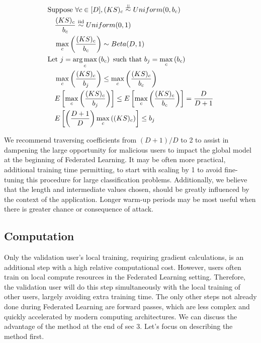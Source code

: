 \documentclass{article} %
\newcommand{\indep}{\perp \!\!\! \perp}
\newcommand{\yli}[1]{{\color{cyan}#1}}
\begin{document}
\begin{align}
    & \textrm{Suppose } \forall c \in \mathopen[ D \mathclose], (KS)_c \overset{\indep}{\sim} Uniform(0, b_c) \nonumber \\
    & \quad \dfrac{(KS)_c}{b_c} \overset{\mathrm{iid}}{\sim} Uniform(0, 1) \nonumber \\
    & \quad \max_c \left( \dfrac{(KS)_c}{b_c} \right) \sim Beta(D, 1) \nonumber \\
    & \textrm{Let } j = \argmax_c \left( b_c \right) \textrm{ such that } b_j = \max_c \left( b_c \right) \nonumber \\
    & \quad \max_c \left( \dfrac{(KS)_c}{b_j} \right) \leq \max_c \left( \dfrac{(KS)_c}{b_c} \right) \nonumber \\
    & \quad E \left[ \max_c \left( \dfrac{(KS)_c}{b_j} \right) \right] \leq E \left[ \max_c \left( \dfrac{(KS)_c}{b_c} \right) \right] = \dfrac{D}{D + 1} \nonumber \\
    & \quad E \left[ \left( \dfrac{D + 1}{D} \right) \max_c \left( (KS)_c \right) \right] \leq b_j \label{eq:leq_bound}
\end{align}

We recommend traversing coefficients from $(D + 1) / D$ to 2 to assist in dampening the large opportunity for malicious users to impact the global model at the beginning of Federated Learning. It may be often more practical, additional training time permitting, to start with scaling by 1 to avoid fine-tuning this procedure for large classification problems. Additionally, we believe that the length and intermediate values chosen, should be greatly influenced by the context of the application. Longer warm-up periods may be most useful when there is greater chance or consequence of attack.


\subsection{Computation}
Only the validation user's local training, requiring gradient calculations, is an additional step with a high relative computational cost. However, users often train on local compute resources in the Federated Learning setting. Therefore, the validation user will do this step simultaneously with the local training of other users, largely avoiding extra training time. The only other steps not already done during Federated Learning are forward passes, which are less complex and quickly accelerated by modern computing architectures. \yli{We can discuss the advantage of the method at the end of sec 3. Let's focus on describing the method first.}
\end{document}
